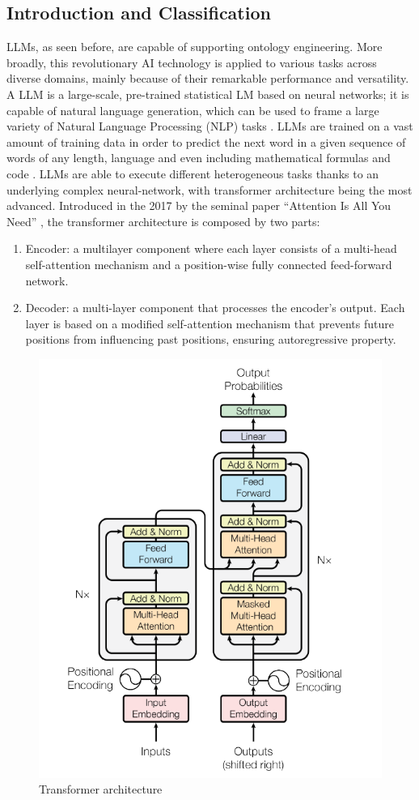 \subsection{Introduction and Classification}
LLMs, as seen before, are capable of supporting ontology engineering.
More broadly, this revolutionary AI technology is applied to various tasks across diverse domains, mainly because of their remarkable performance and versatility.
A LLM is a large-scale, pre-trained statistical LM based on neural networks; it is capable of natural language generation, which can be used to frame a large variety of Natural Language Processing (NLP) tasks \cite{zhao2023survey}.
LLMs are trained on a vast amount of training data in order to predict the next word in a given sequence of words of any length, language and even including mathematical formulas and code \cite{zhao2023survey}.
LLMs are able to execute different heterogeneous tasks thanks to an underlying complex neural-network, with transformer architecture being the most advanced.
Introduced in the 2017 by the seminal paper ``Attention Is All You Need'' \cite{vaswani2017attention}, the transformer architecture is composed by two parts:
\begin{enumerate}
    \item Encoder: a multilayer component where each layer consists of a multi-head self-attention mechanism and a position-wise fully connected feed-forward network.
    
    \item Decoder: a multi-layer component that processes the encoder's output. Each layer is based on a modified self-attention mechanism that prevents future positions from influencing past positions, ensuring autoregressive property.
\end{enumerate}
\begin{figure}[H]
    \centering
    \includegraphics[width=0.5\linewidth]{Figures/fig_17.png}
    \caption{Transformer architecture}
    \label{fig:17}
\end{figure}
